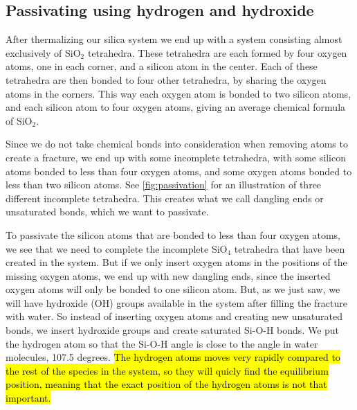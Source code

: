 \subsection{Passivating using hydrogen and hydroxide}
After thermalizing our silica system we end up with a system consisting almost exclusively of SiO$_2$ tetrahedra. These tetrahedra are each formed by four oxygen atoms, one in each corner, and a silicon atom in the center. Each of these tetrahedra are then bonded to four other tetrahedra, by sharing the oxygen atoms in the corners. This way each oxygen atom is bonded to two silicon atoms, and each silicon atom to four oxygen atoms, giving an average chemical formula of SiO$_2$. 

Since we do not take chemical bonds into consideration when removing atoms to create a fracture, we end up with some incomplete tetrahedra, with some silicon atoms bonded to less than four oxygen atoms, and some oxygen atoms bonded to less than two silicon atoms. See \cref{fig:passivation} for an illustration of three different incomplete tetrahedra. This creates what we call dangling ends or unsaturated bonds, which we want to passivate.


To passivate the silicon atoms that are bonded to less than four oxygen atoms, we see that we need to complete the incomplete SiO$_4$ tetrahedra that have been created in the system. But if we only insert oxygen atoms in the positions of the missing oxygen atoms, we end up with new dangling ends, since the inserted oxygen atoms will only be bonded to one silicon atom. But, as we just saw, we will have hydroxide (OH) groups available in the system after filling the fracture with water. So instead of inserting oxygen atoms and creating new unsaturated bonds, we insert hydroxide groups and create saturated Si-O-H bonds. We put the hydrogen atom so that the Si-O-H angle is close to the angle in water molecules, 107.5 degrees. \hl{The hydrogen atoms moves very rapidly compared to the rest of the species in the system, so they will quicly find the equilibrium position, meaning that the exact position of the hydrogen atoms is not that important.}

